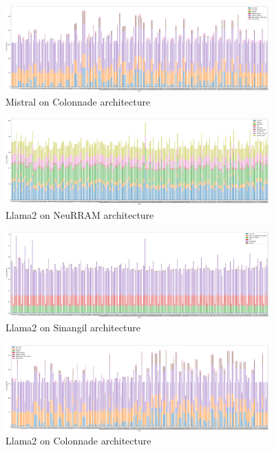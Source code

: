 \documentclass[conference]{IEEEtran}
\begin{document}
\begin{center}
\begin{figure}[ht]
    \centering
    \includegraphics[width=0.9\textwidth]{images/mistral_colonnade_arch.png}
    \caption{Mistral on Colonnade architecture}
    \label{fig:mistral_colonnade}
\end{figure}

\begin{figure}[ht]
    \centering
    \includegraphics[width=0.9\textwidth]{images/llama2_wan_arch.png}
    \caption{Llama2 on NeuRRAM architecture}
    \label{fig:llama2_NeuRRAM}
\end{figure}

\begin{figure}[ht]
    \centering
    \includegraphics[width=0.9\textwidth]{images/llama2_sinangil.png}
    \caption{Llama2 on Sinangil architecture}
    \label{fig:llama2_Sinangil}
\end{figure}

\begin{figure}[ht]
    \centering
    \includegraphics[width=0.9\textwidth]{images/llama2_colonnade_arch.png}
    \caption{Llama2 on Colonnade architecture}
    \label{fig:llama2_Colonnade}
\end{figure}

\end{center}

\twocolumn
\newpage

%
 
\end{document}
